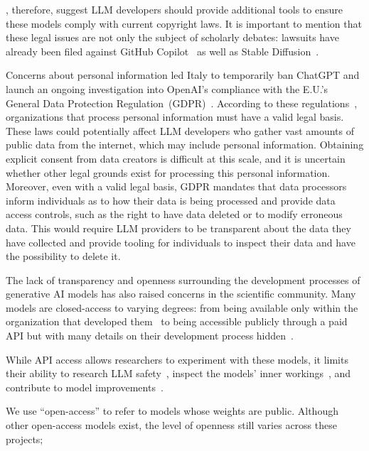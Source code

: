 \citet{henderson2023foundation}, therefore, suggest LLM developers should provide additional tools to ensure these models comply with current copyright laws. It is important to mention that these legal issues are not only the subject of scholarly debates: lawsuits have already been filed against GitHub Copilot~\citep{DOE1vGitHub} as well as Stable Diffusion~\citep{stablediffusion_lawsuit}.

Concerns about personal information led Italy to temporarily ban ChatGPT and launch an ongoing investigation into OpenAI's compliance with the E.U.'s General Data Protection Regulation~(GDPR)~\citep{bbc2023chatgpt_ban}. According to these regulations~\citep{eu2018gdpr,lomas2023gdpr_llms}, organizations that process personal information must have a valid legal basis. These laws could potentially affect LLM developers who gather vast amounts of public data from the internet, which may include personal information. Obtaining explicit consent from data creators is difficult at this scale, and it is uncertain whether other legal grounds exist for processing this personal information. Moreover, even with a valid legal basis, GDPR mandates that data processors inform individuals as to how their data is being processed and provide data access controls, such as the right to have data deleted or to modify erroneous data. This would require LLM providers to be transparent about the data they have collected and provide tooling for individuals to inspect their data and have the possibility to delete it.    

The lack of transparency and openness surrounding the development processes of generative AI models has also raised concerns in the scientific community. Many models are closed-access to varying degrees: from being available only within the organization that developed them~\citep{chowdhery2022palm,hoffmann2022training} to being accessible publicly through a paid API but with many details on their development process hidden~\citep{brown2020language,openai2023gpt4}.

While API access allows researchers to experiment with these models, it limits their ability to research LLM safety~\citep{perez2022red}, inspect the models' inner workings~\citep{olsson2022context}, and contribute to model improvements~\citep{togelius2023choose}. 

We use ``open-access'' to refer to models whose weights are public. Although other open-access models exist, the level of openness still varies across these projects;  

